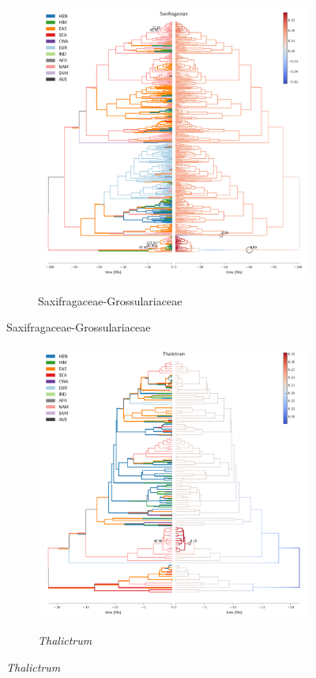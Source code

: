 \begin{figure}
  \ContinuedFloat
\begin{subfigure}{\textwidth}
\centering
\includegraphics[width=.99\linewidth]{figures/Saxifragaceae-supfig.pdf}
\label{fig:allium}
\caption{Saxifragaceae-Grossulariaceae}
\end{subfigure}
\end{figure}

\begin{figure}
  \ContinuedFloat
\begin{subfigure}{\textwidth}
\centering
\includegraphics[width=.99\linewidth]{figures/Thalictrum-supfig.pdf}
\label{fig:allium}
\caption{\textit{Thalictrum}}
\end{subfigure}
\end{figure}


